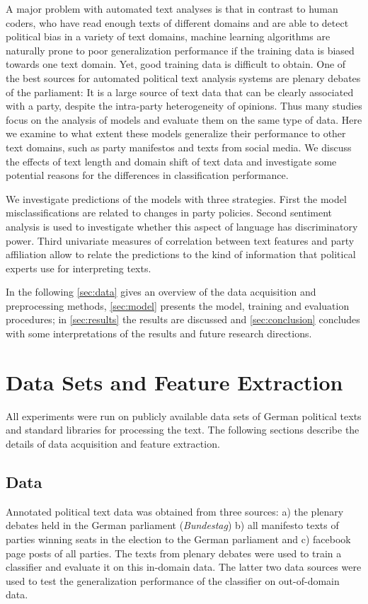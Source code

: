 \documentclass[11pt]{article}
\begin{document}
A major problem with automated text analyses is that in contrast to human coders, who have read enough texts of different domains and are able to detect political bias in a variety of text domains, machine learning algorithms are naturally prone to poor generalization performance if the training data is biased towards one text domain. Yet, good training data is difficult to obtain. One of the best sources for automated political text analysis systems are plenary debates of the parliament: It is a large source of text data that can be clearly associated with a party, despite the intra-party heterogeneity of opinions. Thus many studies focus on the analysis of models and evaluate them on the same type of data. Here we examine to what extent these models generalize their performance to other text domains, such as party manifestos and texts from social media. 
We discuss the effects of text length and domain shift of text data and investigate some potential reasons for the differences in classification performance. 

We investigate predictions of the models with three strategies. First the model misclassifications are related to changes in party policies. Second sentiment analysis is used to investigate whether this aspect of language has discriminatory power. Third univariate measures of correlation between text features and party affiliation allow to relate the predictions to the kind of information that political experts use for interpreting texts. 

In the following \autoref{sec:data} gives an overview of the data acquisition and preprocessing methods, \autoref{sec:model} presents the model, training and evaluation procedures; in \autoref{sec:results} the results are discussed and \autoref{sec:conclusion} concludes with some interpretations of the results and future research directions.

\section{Data Sets and Feature Extraction}\label{sec:data}
%
All experiments were run on publicly available data sets of German political texts and standard libraries for processing the text. The following sections describe the details of data acquisition and feature extraction.

\subsection{Data}
Annotated political text data was obtained from three sources: a) the plenary debates held in the German parliament ({\em Bundestag}) b) all manifesto texts of parties winning seats in the election to the German parliament and c) facebook page posts of all parties. The texts from plenary debates were used to train a classifier and evaluate it on this in-domain data. The latter two data sources were used to test the generalization performance of the classifier on out-of-domain data. 
\end{document}
